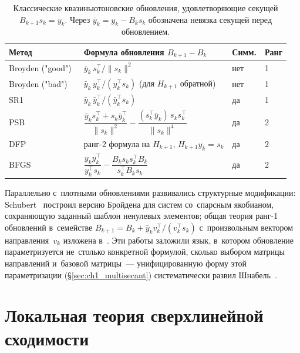 \begin{table}[h]
\centering
\caption{Классические квазиньютоновские обновления, удовлетворяющие
секущей $B_{k+1}s_k = y_k$. Через $\bar y_k = y_k - B_k s_k$
обозначена невязка секущей перед обновлением.}\label{tab:ch1_qn}
\renewcommand{\arraystretch}{1.35}
\begin{tabular}{@{}p{3.1cm} p{6.2cm} p{1.6cm} p{1.6cm}@{}}
\toprule
Метод & Формула обновления $B_{k+1} - B_k$ & Симм. & Ранг \\
\midrule
Broyden ("good")~\cite{broyden1965}
  & $\bar y_k\, s_k^\top / \|s_k\|^2$
  & нет & 1 \\
Broyden ("bad")~\cite{broyden1965}
  & $\bar y_k\, y_k^\top / (y_k^\top s_k)$ (для $H_{k+1}$ обратной)
  & нет & 1 \\
SR1~\cite{conn1991,bfgs}
  & $\bar y_k\,\bar y_k^\top / (\bar y_k^\top s_k)$
  & да & 1 \\
PSB~\cite{powell1970,dennis1977}
  & $\dfrac{\bar y_k s_k^\top + s_k \bar y_k^\top}{\|s_k\|^2}
     - \dfrac{(s_k^\top \bar y_k)\, s_k s_k^\top}{\|s_k\|^4}$
  & да & 2 \\
DFP~\cite{davidon1991,dennis1977}
  & ранг-2 формула на $H_{k+1}$, $H_{k+1} y_k = s_k$
  & да & 2 \\
BFGS~\cite{bfgs}
  & $\dfrac{y_k y_k^\top}{y_k^\top s_k} - \dfrac{B_k s_k s_k^\top B_k}{s_k^\top B_k s_k}$
  & да & 2 \\
\bottomrule
\end{tabular}
\end{table}

Параллельно с~плотными обновлениями развивались структурные
модификации: Schubert~\cite{schubert1970} построил версию Бройдена для
систем со~спарсным якобианом, сохраняющую заданный шаблон ненулевых
элементов; общая теория ранг-1 обновлений в~семействе
$B_{k+1} = B_k + \bar y_k v_k^\top/(v_k^\top s_k)$ с~произвольным
вектором направления~$v_k$ изложена в~\cite{gay1979}. Эти работы
заложили язык, в~котором обновление параметризуется не~столько
конкретной формулой, сколько выбором матрицы направлений и~базовой
матрицы~--- унифицированную форму этой параметризации
(\S\ref{sec:ch1_multisecant}) систематически развил
Шнабель~\cite{schnabel1983}.


\section{Локальная теория сверхлинейной сходимости}\label{sec:ch1_local}

